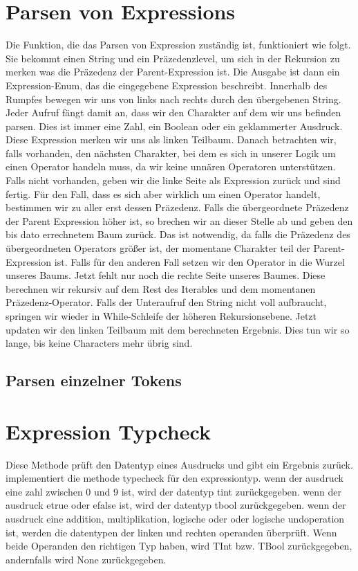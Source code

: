 \documentclass[a4paper, 1ppt]{article}
\begin{document}
\section{Parsen von Expressions}
Die Funktion, die das Parsen von Expression zuständig ist, funktioniert wie folgt.
Sie bekommt einen String und ein Präzedenzlevel, um sich in der Rekursion zu merken
was die Präzedenz der Parent-Expression ist. Die Ausgabe ist dann ein Expression-Enum, das die eingegebene Expression beschreibt.
Innerhalb des Rumpfes bewegen wir uns von links nach rechts durch den übergebenen String.
Jeder Aufruf fängt damit an, dass wir den Charakter auf dem wir uns befinden parsen.
Dies ist immer eine Zahl, ein Boolean oder ein geklammerter Ausdruck. 
Diese Expression merken wir uns als linken Teilbaum.
Danach betrachten wir, falls vorhanden, den nächsten Charakter, bei dem es sich in unserer Logik um einen Operator handeln muss, 
da wir keine unnären Operatoren unterstützen. Falls nicht vorhanden, geben wir die linke Seite als Expression zurück und sind fertig.
Für den Fall, dass es sich aber wirklich um einen Operator handelt, bestimmen wir zu aller erst dessen Präzedenz.
Falls die übergeordnete Präzedenz der Parent Expression höher ist, so brechen wir an dieser Stelle ab und geben den bis dato errechnetem Baum zurück.
Das ist notwendig, da falls die Präzedenz des übergeordneten Operators größer ist, der momentane Charakter teil der Parent-Expression ist.
Falls für den anderen Fall setzen wir den Operator in die Wurzel unseres Baums. 
Jetzt fehlt nur noch die rechte Seite unseres Baumes.
Diese berechnen wir rekursiv auf dem Rest des Iterables und dem momentanen Präzedenz-Operator.
Falls der Unteraufruf den String nicht voll aufbraucht, springen wir wieder in While-Schleife der höheren Rekursionsebene.
Jetzt updaten wir den linken Teilbaum mit dem berechneten Ergebnis.
Dies tun wir so lange, bis keine Characters mehr übrig sind.
\subsection{Parsen einzelner Tokens}

\section{Expression Typcheck}
Diese Methode prüft den Datentyp eines Ausdrucks und gibt ein Ergebnis zurück.
implementiert die methode typecheck für den expressiontyp.
wenn der ausdruck eine zahl zwischen 0 und 9 ist, wird der datentyp tint zurückgegeben.
wenn der ausdruck etrue oder efalse ist, wird der datentyp tbool zurückgegeben.
wenn der ausdruck eine addition, multiplikation, logische oder oder logische undoperation ist, werden die datentypen der linken und rechten operanden überprüft.
Wenn beide Operanden den richtigen Typ haben, wird TInt bzw.
TBool zurückgegeben, andernfalls wird None zurückgegeben.
\end{document}
